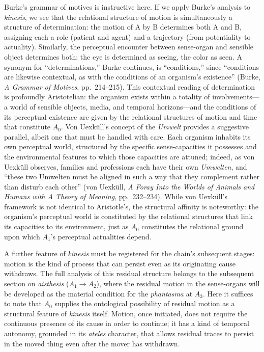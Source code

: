 Burke's grammar of motives is instructive here. If we apply Burke's analysis to \textit{kinesis}, we see that the relational structure of motion is simultaneously a structure of determination: the motion of A by B determines both A and B, assigning each a role (patient and agent) and a trajectory (from potentiality to actuality). Similarly, the perceptual encounter between sense-organ and sensible object determines both: the eye is determined as seeing, the color as seen. A synonym for ``determinations,'' Burke continues, is ``conditions,'' since ``conditions are likewise contextual, as with the conditions of an organism's existence'' (Burke, \textit{A Grammar of Motives}, pp.~214--215). This contextual reading of determination is profoundly Aristotelian: the organism exists within a totality of involvements---a world of sensible objects, media, and temporal horizons---and the conditions of its perceptual existence are given by the relational structures of motion and time that constitute $A_0$. Von Uexküll's concept of the \textit{Umwelt} provides a suggestive parallel, albeit one that must be handled with care. Each organism inhabits its own perceptual world, structured by the specific sense-capacities it possesses and the environmental features to which those capacities are attuned; indeed, as von Uexküll observes, families and professions each have their own \textit{Umwelten}, and ``these two Umwelten must be aligned in such a way that they complement rather than disturb each other'' (von Uexküll, \textit{A Foray Into the Worlds of Animals and Humans with A Theory of Meaning}, pp.~232--234). While von Uexküll's framework is not identical to Aristotle's, the structural affinity is noteworthy: the organism's perceptual world is constituted by the relational structures that link its capacities to its environment, just as $A_0$ constitutes the relational ground upon which $A_1$'s perceptual actualities depend.

A further feature of \textit{kinesis} must be registered for the chain's subsequent stages: motion is the kind of process that can persist even as its originating cause withdraws. The full analysis of this residual structure belongs to the subsequent section on \textit{aisthēsis} ($A_1 \to A_2$), where the residual motion in the sense-organs will be developed as the material condition for the \textit{phantasma} at $A_3$. Here it suffices to note that $A_0$ supplies the ontological possibility of residual motion as a structural feature of \textit{kinesis} itself. Motion, once initiated, does not require the continuous presence of its cause in order to continue; it has a kind of temporal autonomy, grounded in its \textit{ateles} character, that allows residual traces to persist in the moved thing even after the mover has withdrawn.

